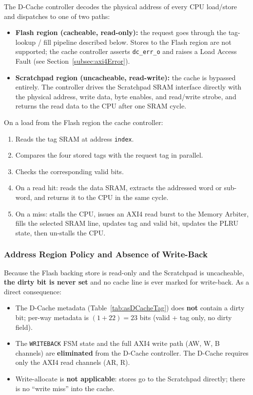 The D-Cache controller decodes the physical address of every CPU load/store
and dispatches to one of two paths:

\begin{itemize}
  \item \textbf{Flash region (cacheable, read-only):} the request goes
    through the tag-lookup / fill pipeline described below.
    Stores to the Flash region are not supported; the cache controller
    asserts \texttt{dc\_err\_o} and raises a Load Access Fault (see Section~\ref{subsec:axi4Error}).
  \item \textbf{Scratchpad region (uncacheable, read-write):} the cache is
    bypassed entirely.
    The controller drives the Scratchpad SRAM interface directly with the
    physical address, write data, byte enables, and read/write strobe, and
    returns the read data to the CPU after one SRAM cycle.
\end{itemize}

On a load from the Flash region the cache controller:
\begin{enumerate}
  \item Reads the tag SRAM at address \texttt{index}.
  \item Compares the four stored tags with the request tag in parallel.
  \item Checks the corresponding valid bits.
  \item On a read hit: reads the data SRAM, extracts the addressed word or
    sub-word, and returns it to the CPU in the same cycle.
  \item On a miss: stalls the CPU, issues an AXI4 read burst to the Memory
    Arbiter, fills the selected SRAM line, updates tag and valid bit,
    updates the PLRU state, then un-stalls the CPU.
\end{enumerate}

\subsubsection{Address Region Policy and Absence of Write-Back}
\label{subsubsec:dcacheAddrPolicy}

Because the Flash backing store is read-only and the Scratchpad is
uncacheable, \textbf{the dirty bit is never set} and no cache line is ever
marked for write-back.
As a direct consequence:

\begin{itemize}
  \item The D-Cache metadata (Table~\ref{tab:asDCacheTag}) does \textbf{not}
    contain a dirty bit; per-way metadata is $(1+22)=23$ bits
    (valid + tag only, no dirty field).
  \item The \texttt{WRITEBACK} FSM state and the full AXI4 write path
    (AW, W, B channels) are \textbf{eliminated} from the D-Cache
    controller.
    The D-Cache requires only the AXI4 read channels (AR, R).
  \item Write-allocate is \textbf{not applicable}: stores go to the
    Scratchpad directly; there is no ``write miss'' into the cache.
\end{itemize}

